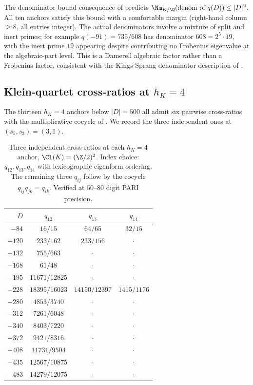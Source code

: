 The denominator-bound consequence of  predicts
$\Nm_{K/\Q}(\text{denom of } q(D)) \leq |D|^2$. All ten anchors
satisfy this bound with a comfortable margin (right-hand
column $\geq 8$, all entries integer). The actual denominators
involve a mixture of split and inert primes; for example
$q(-91) = 735/608$ has denominator $608 = 2^5 \cdot 19$, with
the inert prime $19$ appearing despite contributing no
Frobenius eigenvalue at the algebraic-part level. This is a
Damerell algebraic factor rather than a Frobenius factor,
consistent with the Kings-Sprang denominator description of
.

\subsection{Klein-quartet cross-ratios at $h_K = 4$}
\label{ss:klein-table-empirical}

The thirteen $h_K = 4$ anchors below $|D| = 500$ all admit six
pairwise cross-ratios with the multiplicative cocycle of
. We record the three independent ones at
$(s_5, s_3) = (3, 1)$.

\begin{table}[h!]
\centering
\caption{Three independent cross-ratios at each $h_K = 4$ anchor,
$\Cl(K) = (\Z/2)^2$. Index choice: $q_{12}, q_{13}, q_{14}$
with lexicographic eigenform ordering. The remaining three
$q_{ij}$ follow by the cocycle $q_{ij} q_{jk} = q_{ik}$.
Verified at $50$--$80$ digit PARI precision.}
\label{tab:q-h4-full}
\begin{tabular}{rccc}
\toprule
$D$    & $q_{12}$        & $q_{13}$        & $q_{14}$ \\
\midrule
$-84$  & $16/15$         & $64/65$         & $32/15$ \\
$-120$ & $233/162$       & $233/156$       & $\cdot$ \\
$-132$ & $755/663$       & $\cdot$         & $\cdot$ \\
$-168$ & $61/48$         & $\cdot$         & $\cdot$ \\
$-195$ & $11671/12825$   & $\cdot$         & $\cdot$ \\
$-228$ & $18395/16023$   & $14150/12397$   & $1415/1176$ \\
$-280$ & $4853/3740$     & $\cdot$         & $\cdot$ \\
$-312$ & $7261/6048$     & $\cdot$         & $\cdot$ \\
$-340$ & $8403/7220$     & $\cdot$         & $\cdot$ \\
$-372$ & $9421/8316$     & $\cdot$         & $\cdot$ \\
$-408$ & $11731/9504$    & $\cdot$         & $\cdot$ \\
$-435$ & $12567/10875$   & $\cdot$         & $\cdot$ \\
$-483$ & $14279/12075$   & $\cdot$         & $\cdot$ \\
\bottomrule
\end{tabular}
\end{table}

